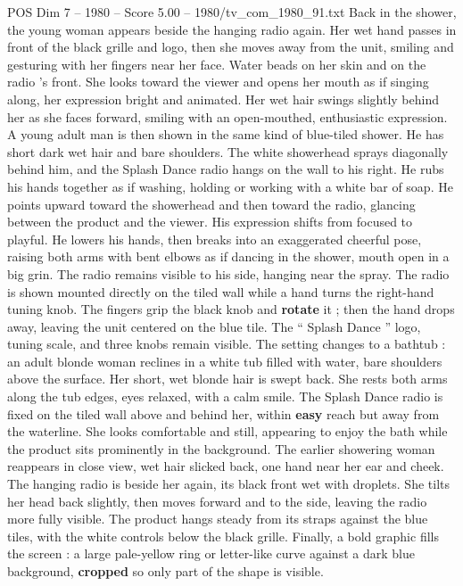\begin{textsample}{POS Dim 7 – 1980 – Score 5.00 – 1980/tv\_com\_1980\_91.txt}
Back in the shower, the young woman appears beside the hanging radio again.
Her wet hand passes in front of the black grille and logo, then she moves away from the unit, smiling and gesturing with her fingers near her face.
Water beads on her skin and on the radio ’s front.
She looks toward the viewer and opens her mouth as if singing along, her expression bright and animated.
Her wet hair swings slightly behind her as she faces forward, smiling with an open-mouthed, enthusiastic expression.
A young adult man is then shown in the same kind of blue-tiled shower.
He has short dark wet hair and bare shoulders.
The white showerhead sprays diagonally behind him, and the Splash Dance radio hangs on the wall to his right.
He rubs his hands together as if washing, holding or working with a white bar of soap.
He points upward toward the showerhead and then toward the radio, glancing between the product and the viewer.
His expression shifts from focused to playful.
He lowers his hands, then breaks into an exaggerated cheerful pose, raising both arms with bent elbows as if dancing in the shower, mouth open in a big grin.
The radio remains visible to his side, hanging near the spray.
The radio is shown mounted directly on the tiled wall while a hand turns the right-hand tuning knob.
The fingers grip the black knob and \textbf{rotate} it ; then the hand drops away, leaving the unit centered on the blue tile.
The “ Splash Dance ” logo, tuning scale, and three knobs remain visible.
The setting changes to a bathtub : an adult blonde woman reclines in a white tub filled with water, bare shoulders above the surface.
Her short, wet blonde hair is swept back.
She rests both arms along the tub edges, eyes relaxed, with a calm smile.
The Splash Dance radio is fixed on the tiled wall above and behind her, within \textbf{easy} reach but away from the waterline.
She looks comfortable and still, appearing to enjoy the bath while the product sits prominently in the background.
The earlier showering woman reappears in close view, wet hair slicked back, one hand near her ear and cheek.
The hanging radio is beside her again, its black front wet with droplets.
She tilts her head back slightly, then moves forward and to the side, leaving the radio more fully visible.
The product hangs steady from its straps against the blue tiles, with the white controls below the black grille.
Finally, a bold graphic fills the screen : a large pale-yellow ring or letter-like curve against a dark blue background, \textbf{cropped} so only part of the shape is visible.

\end{textsample}
